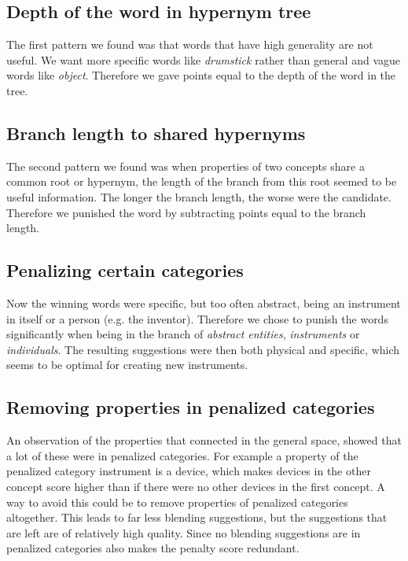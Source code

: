 \subsection{Depth of the word in hypernym tree}
The first pattern we found was that words that have high generality are not useful. We want more specific words like \emph{drumstick} rather than general and vague words like \emph{object}. Therefore we gave points equal to the depth of the word in the tree.
\subsection{Branch length to shared hypernyms}
The second pattern we found was when properties of two concepts share a common root or hypernym, the length of the branch from this root seemed to be useful information. The longer the branch length, the worse were the candidate. Therefore we punished the word by subtracting points equal to the branch length.
\subsection{Penalizing certain categories}
Now the winning words were specific, but too often abstract, being an instrument in itself or a person (e.g. the inventor). Therefore we chose to punish the words significantly when being in the branch of \emph{abstract entities}, \emph{instruments} or \emph{individuals}. The resulting suggestions were then both physical and specific, which seems to be optimal for creating new instruments.
\subsection{Removing properties in penalized categories}
An observation of the properties that connected in the general space, showed that a lot of these were in penalized categories. For example a property of the penalized category instrument is a device, which makes devices in the other concept score higher than if there were no other devices in the first concept. A way to avoid this could be to remove properties of penalized categories altogether. This leads to far less blending suggestions, but the suggestions that are left are of relatively high quality. Since no blending suggestions are in penalized categories also makes the penalty score redundant.

